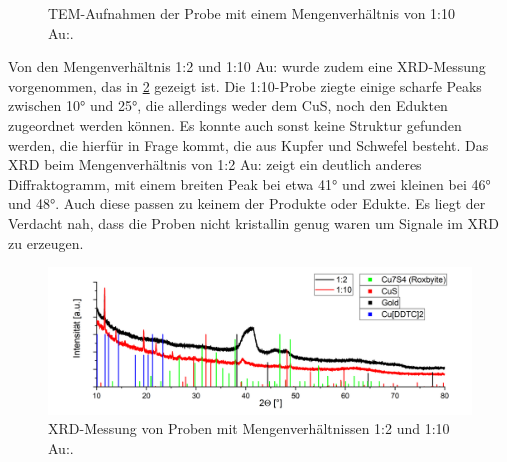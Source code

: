 	\begin{figure}[htbp]
		\centering
		\caption{TEM-Aufnahmen der Probe mit einem Mengenverhältnis von 1:10 Au:.}
		\label{fig:TEM-CuAu-10-1}
	\end{figure}
	
	Von den Mengenverhältnis 1:2 und 1:10 Au: wurde zudem eine XRD-Messung vorgenommen, das in \cref{fig:XRD} gezeigt ist.
	Die 1:10-Probe ziegte einige scharfe Peaks zwischen 10° und 25°, die allerdings weder dem CuS, noch den Edukten zugeordnet werden können.
	Es konnte auch sonst keine Struktur gefunden werden, die hierfür in Frage kommt, die aus Kupfer und Schwefel besteht.
	Das XRD beim  Mengenverhältnis von 1:2 Au: zeigt ein deutlich anderes Diffraktogramm, mit einem breiten Peak bei etwa 41° und zwei kleinen bei 46° und 48°. Auch diese passen zu keinem der Produkte oder Edukte.
	Es liegt der Verdacht nah, dass die Proben nicht kristallin genug waren um Signale im XRD zu erzeugen.
	
	\begin{figure}[H]
		\centering
		\includegraphics[width=\textwidth]{Bilder/XRD-CuS} 	
		\caption{XRD-Messung von Proben mit Mengenverhältnissen 1:2 und 1:10 Au:.}
		\label{fig:XRD}
	\end{figure}
	

